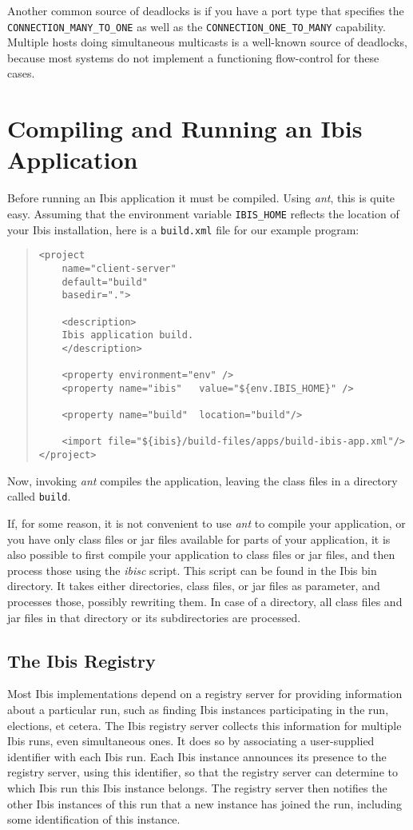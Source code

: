 \documentclass[10pt]{article}
\newcommand{\mysection}[1]{\section{#1}\label{#1}}
\newcommand{\mysubsection}[1]{\subsection{#1}\label{#1}}
\begin{document}
Another common source of deadlocks is if you have a port type that
specifies the \texttt{CONNECTION\_MANY\_TO\_ONE} as well as the
\texttt{CONNECTION\_ONE\_TO\_MANY} capability.
Multiple hosts doing simultaneous multicasts
is a well-known source of deadlocks, because most systems do not
implement a functioning flow-control for these cases.

\mysection{Compiling and Running an Ibis Application}

Before running an Ibis application it must be compiled.  Using
\emph{ant}, this is quite easy. Assuming that the environment variable
\texttt{IBIS\_HOME} reflects the location of your Ibis installation,
here is a \texttt{build.xml} file
for our example program:

{\small
\begin{quote}
\begin{verbatim}
<project
    name="client-server"
    default="build"
    basedir=".">

    <description>
    Ibis application build.
    </description>

    <property environment="env" />
    <property name="ibis"   value="${env.IBIS_HOME}" />

    <property name="build"  location="build"/>

    <import file="${ibis}/build-files/apps/build-ibis-app.xml"/>
</project>
\end{verbatim}
\end{quote}
}

Now, invoking \emph{ant} compiles the application, leaving the class files
in a directory called \texttt{build}.

If, for some reason, it is not convenient to use \emph{ant} to compile
your application, or you have only class files or jar files available
for parts of your application, it is also possible to first compile
your application to class files or jar files, and then process those
using the \emph{ibisc} script. This script can be found in the Ibis
bin directory. It takes either directories, class files, or jar files
as parameter, and processes those, possibly rewriting them. In case
of a directory, all class files and jar files in that directory or
its subdirectories are processed.

\mysubsection{The Ibis Registry}

Most Ibis implementations depend on a registry server for providing
information about a particular run, such as finding Ibis instances
participating in the run, elections, et cetera.
The Ibis registry server collects this information for multiple Ibis
runs, even simultaneous ones. It does so by associating a user-supplied
identifier with each Ibis run. Each Ibis instance announces its
presence to the registry server, using this identifier, so that the
registry server can determine to which Ibis run this Ibis instance belongs.
The registry server then notifies the other Ibis instances of this run that
a new instance has joined the run, including some identification of
this instance.
\end{document}
